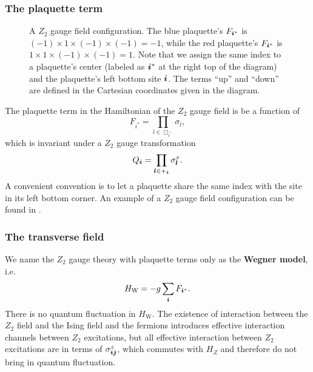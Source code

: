 \documentclass[hyperref, a4paper]{article}
\newcommand*{\concept}[1]{{\textbf{#1}}}
\newcommand*{\Ztwo}{\texorpdfstring{$\mathbb{Z}_2$ }{Z2 }}
\def\mathbb#1{#1}%
\begin{document}
\subsubsection{The plaquette term}

\begin{figure}
    \centering
    
    \caption{A \Ztwo gauge field configuration. The blue plaquette's $F_{\vb*{i}^*}$ is $(-1) \times 1 \times (-1) \times (-1) = -1$, %
    while the red plaquette's $F_{\vb*{i}^*}$ is $1 \times 1 \times (-1) \times (-1) = 1$. %
    Note that we assign the same index to a plaquette's center (labeled as $\vb*{i}^*$ at the right top of the diagram) %
    and the plaquette's left bottom site $\vb*{i}$. %
    The terms ``up'' and ``down'' are defined in the Cartesian coordinates given in the diagram.}
    \label{fig:z2-gauge-field}
\end{figure}

The plaquette term in the Hamiltonian of the \Ztwo gauge field is be a function of
\begin{equation}
    F_{i^*} = \prod_{l \in \Box_{i^*}} \sigma_l,
\end{equation}
which is invariant under a \Ztwo gauge transformation
\begin{equation}
    Q_{\vb*{i}} = \prod_{\vb*{l} \in +_{\vb*{i}}} \sigma^x_{\vb*{l}}.
\end{equation}
A convenient convention is to let a plaquette share the same index with the site in its left bottom corner. 
An example of a \Ztwo gauge field configuration can be found in .

\subsubsection{The transverse field}

We name the \Ztwo gauge theory with plaquette terms only as the \concept{Wegner model}, i.e.
\begin{equation}
    H_\text{W} = - g \sum_{\vb*{i}} F_{{\vb*{i}}^*}.
\end{equation}
There is no quantum fluctuation in $H_\text{W}$. 
The existence of interaction between the \Ztwo field and the Ising field and the fermions introduces effective interaction channels between \Ztwo excitations, but all effective interaction between \Ztwo excitations are in terms of $\sigma^z_{\vb*{i} \vb*{j}}$, which commutes with $H_Z$ and therefore do not bring in quantum fluctuation.
\end{document}
